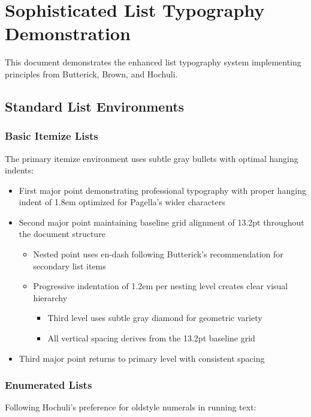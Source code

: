 \documentclass[11pt,letterpaper]{article}
\begin{document}
\section{Sophisticated List Typography Demonstration}

This document demonstrates the enhanced list typography system implementing principles from Butterick, Brown, and Hochuli.

\subsection{Standard List Environments}

\subsubsection{Basic Itemize Lists}

The primary itemize environment uses subtle gray bullets with optimal hanging indents:

\begin{itemize}
\item First major point demonstrating professional typography with proper hanging indent of 1.8em optimized for Pagella's wider characters
\item Second major point maintaining baseline grid alignment of 13.2pt throughout the document structure
  \begin{itemize}
  \item Nested point uses en-dash following Butterick's recommendation for secondary list items
  \item Progressive indentation of 1.2em per nesting level creates clear visual hierarchy
    \begin{itemize}
    \item Third level uses subtle gray diamond for geometric variety
    \item All vertical spacing derives from the 13.2pt baseline grid
    \end{itemize}
  \end{itemize}
\item Third major point returns to primary level with consistent spacing
\end{itemize}

\subsubsection{Enumerated Lists}

Following Hochuli's preference for oldstyle numerals in running text:
\end{document}
